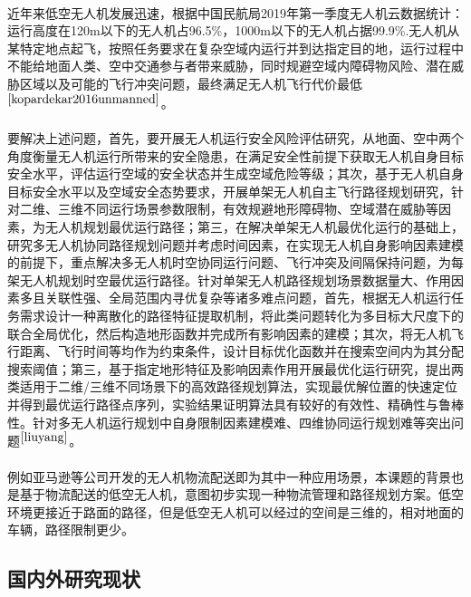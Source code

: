 \documentclass[UTF8,a4paper]{ctexart}
\begin{document}
\paragraph{}近年来低空无人机发展迅速，根据中国民航局2019年第一季度无人机云数据统计：运行高度在120m以下的无人机占96.5\%，1000m以下的无人机占据99.9\%.无人机从某特定地点起飞，按照任务要求在复杂空域内运行并到达指定目的地，运行过程中不能给地面人类、空中交通参与者带来威胁，同时规避空域内障碍物风险、潜在威胁区域以及可能的飞行冲突问题，最终满足无人机飞行代价最低$^{\cite{kopardekar2016unmanned}}$。
\paragraph{}要解决上述问题，首先，要开展无人机运行安全风险评估研究，从地面、空中两个角度衡量无人机运行所带来的安全隐患，在满足安全性前提下获取无人机自身目标安全水平，评估运行空域的安全状态并生成空域危险等级；其次，基于无人机自身目标安全水平以及空域安全态势要求，开展单架无人机自主飞行路径规划研究，针对二维、三维不同运行场景参数限制，有效规避地形障碍物、空域潜在威胁等因素，为无人机规划最优运行路径；第三，在解决单架无人机最优化运行的基础上，研究多无人机协同路径规划问题并考虑时间因素，在实现无人机自身影响因素建模的前提下，重点解决多无人机时空协同运行问题、飞行冲突及间隔保持问题，为每架无人机规划时空最优运行路径。针对单架无人机路径规划场景数据量大、作用因素多且关联性强、全局范围内寻优复杂等诸多难点问题，首先，根据无人机运行任务需求设计一种离散化的路径特征提取机制，将此类问题转化为多目标大尺度下的联合全局优化，然后构造地形函数并完成所有影响因素的建模；其次，将无人机飞行距离、飞行时间等均作为约束条件，设计目标优化函数并在搜索空间内为其分配搜索阈值；第三，基于指定地形特征及影响因素作用开展最优化运行研究，提出两类适用于二维/三维不同场景下的高效路径规划算法，实现最优解位置的快速定位并得到最优运行路径点序列，实验结果证明算法具有较好的有效性、精确性与鲁棒性。针对多无人机运行规划中自身限制因素建模难、四维协同运行规划难等突出问题$^{\cite{liuyang}}$。
\paragraph{}例如亚马逊等公司开发的无人机物流配送即为其中一种应用场景，本课题的背景也是基于物流配送的低空无人机，意图初步实现一种物流管理和路径规划方案。低空环境更接近于路面的路径，但是低空无人机可以经过的空间是三维的，相对地面的车辆，路径限制更少。
\subsection{国内外研究现状}
\end{document}
